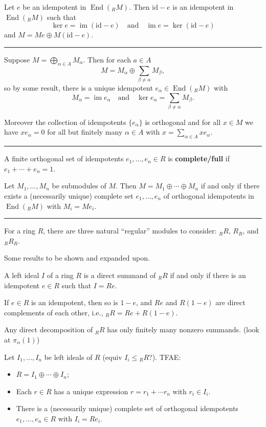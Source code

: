 \documentclass[12pt]{article}
\newcommand{\keyword}[1]{\textbf{#1}}
\newcommand{\sepline}{\rule{\textwidth}{0.4pt}}
\theoremstyle{definition}
\newcommand{\isp}[1]{\quad\text{#1}\quad}
\newcommand{\<}{\left\langle}
\renewcommand{\>}{\right\rangle}
\newcommand{\id}{\mathrm{id}}
\DeclareMathOperator{\im}{im}
\DeclareMathOperator{\End}{End}
\renewcommand{\_}[1]{{_{#1}}}
\begin{document}
Let $e$ be an idempotent in $\End(\_RM)$.
Then $\id - e$ is an idempotent in $\End(\_RM)$ such that
\[
    \ker e = \im(\id - e) \isp{and} \im e = \ker(\id - e)
\]
and $M = Me \oplus M(\id - e)$.

\sepline

Suppose $M = \bigoplus_{\alpha \in A} M_\alpha$.
Then for each $a \in A$
\[
    M = M_\alpha \oplus \sum_{\beta \ne \alpha} M_\beta,
\]
so by some result, there is a unique idempotent $e_\alpha \in \End(\_RM)$ with
\[
    M_\alpha = \im e_\alpha \isp{and} \ker e_\alpha = \sum_{\beta \ne \alpha} M_\beta.
\]

Moreover the collection of idempotents $\{e_\alpha\}$ is orthogonal and for all $x \in M$ we have $xe_\alpha = 0$ for all but finitely many $\alpha \in A$ with $x = \sum_{\alpha \in A} x e_\alpha$.

\sepline



A finite orthogonal set of idempotents $e_1, \dots, e_n \in R$ is \keyword{complete/full} if $e_1 + \cdots + e_n = 1$.


Let $M_1, \dots, M_n$ be submodules of $M$. Then $M = M_1 \oplus \cdots \oplus M_n$ if and only if there exists a (necessarily unique) complete set $e_1, \dots, e_n$ of orthogonal idempotents in $\End(\_RM)$ with $M_i = Me_i$.

\sepline

For a ring $R$, there are three natural ``regular'' modules to consider: $\_RR$, $R_R$, and $\_RR_R$.

Some results to be shown and expanded upon.

A left ideal $I$ of a ring $R$ is a direct summand of $\_RR$ if and only if there is an idempotent $e \in R$ such that $I = Re$.

If $e \in R$ is an idempotent, then so is $1 - e$, and $Re$ and $R(1 - e)$ are direct complements of each other, i.e., $\_RR = Re + R(1 - e)$.

Any direct decomposition of $\_RR$ has only finitely many nonzero summands.
(look at $\pi_\alpha(1)$)

Let $I_1, \dots, I_n$ be left ideals of $R$ (equiv $I_i \leq \_RR$?). TFAE:
\begin{itemize}
    \item $R = I_1 \oplus \cdots \oplus I_n$;
    \item Each $r \in R$ has a unique expression $r = r_1 + \cdots r_n$ with $r_i \in I_i$.
    \item There is a (necessarily unique) complete set of orthogonal idempotents $e_1, \dots, e_n \in R$ with $I_i = Re_i$.
\end{itemize}
\end{document}

